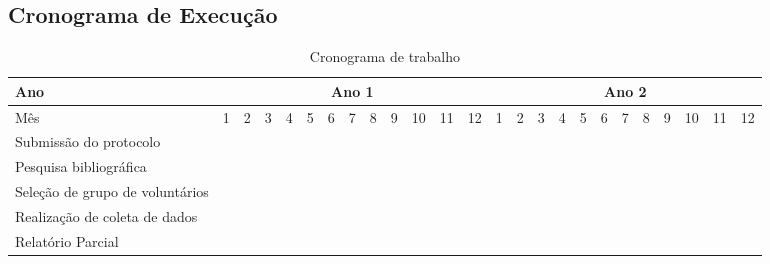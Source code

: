 \documentclass[rascunho,xindy]{Classe-Latex-FEI/fei}
\begin{document}
\begin{landscape}

\chapter{Cronograma de Execução}




\begin{table}[ht]
  \caption{Cronograma de trabalho}
  \begin{center}
      \begin{tabular}{|l |l |l |l |l ||l |l |l |l ||l |l |l |l ||l |l |l |l ||l |l |l |l ||l |l |l |l ||}
      \hline
      Ano        & \multicolumn{12}{c||}{Ano 1} & \multicolumn{12}{c||}{Ano 2}\\
      \hline
      Mês & 1 & 2 & 3 & 4 & 5 & 6 & 7 & 8 & 9 & 10 & 11 & 12 & 1 & 2 & 3 & 4 & 5 & 6 & 7 & 8 & 9 & 10 & 11 & 12\\
      \hline
      Submissão do protocolo            & \cellcolor{black!80} & \cellcolor{black!80} & \cellcolor{black!80} & \cellcolor{black!80} &   &   &   &   &   &   &   &   &   &   &   &   &   &   &   &   &   &   &   &   \\
      Pesquisa bibliográfica            & \cellcolor{black!80} & \cellcolor{black!80} & \cellcolor{black!80} & \cellcolor{black!80} &   &   &   &   &   &   &   &   &   &   &   &   &   &   &   &   &   &   &   &   \\
      Seleção de grupo de voluntários   &   & \cellcolor{black!80} & \cellcolor{black!80} & \cellcolor{black!80} & \cellcolor{black!80} &   &   &   &   &   &   &   &   &   &   &   &   &   &   &   &   &   &   &   \\
      Realização de coleta de dados     &   &   &   & \cellcolor{black!80} & \cellcolor{black!80} & \cellcolor{black!80} &   &   &   &   &   &   &   &   &   &   &   &   &   &   &   &   &   &   \\
      Relatório Parcial                 &   &   &   & \cellcolor{black!80} & \cellcolor{black!80} & \cellcolor{black!80} & \cellcolor{black!80} &   &   &   &   &   &   &   &   &   &   &   &   &   &   &   &   &   \\

\end{tabular}
\end{center}
\end{table}
\end{landscape}
\end{document}
